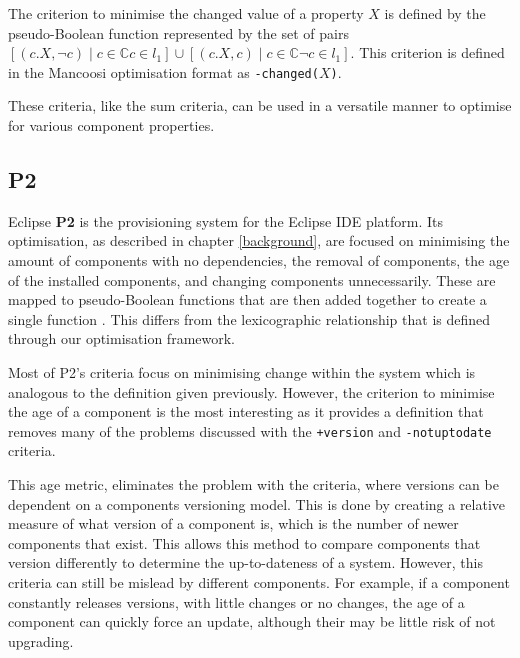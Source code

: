 \begin{defs}
The criterion to minimise the changed value of a property $X$ is defined by the pseudo-Boolean function 
represented by the set of pairs $[(c.X,\neg c) \mid c \in \mathbb{C} c \in l_1] \cup [(c.X,c) \mid c \in \mathbb{C} \neg c \in l_1]$.
This criterion is defined in the Mancoosi optimisation format as \verb!-changed(!$X$\verb+)+.
\end{defs}

These criteria, like the sum criteria, can be used in a versatile manner to optimise for various component properties.

\subsection{P2}
Eclipse \textbf{P2} \cite{le_berre_dependency_2009,leBerre2010} is the provisioning system for the Eclipse IDE platform.
Its optimisation, as described in chapter \ref{background}, are focused on minimising the amount of components with no dependencies, the removal of components,
the age of the installed components, and changing components unnecessarily.
These are mapped to pseudo-Boolean functions that are then added together to create a single function \citep{leBerre2010}.
This differs from the lexicographic relationship that is defined through our optimisation framework.

Most of P2's criteria focus on minimising change within the system which is analogous to the definition given previously.
However, the criterion to minimise the age of a component is the most interesting as it provides a definition that removes many of the problems
discussed with the  \verb!+version! and \verb+-notuptodate+ criteria.


This age metric, eliminates the problem with the criteria, where versions can be dependent on a components versioning model.
This is done by creating a relative measure of what version of a component is, which is the number of newer components that exist.
This allows this method to compare components that version differently to determine the up-to-dateness of a system.
However, this criteria can still be mislead by different components.
For example, if a component constantly releases versions, with little changes or no changes, the age of a component can quickly force an update, 
although their may be little risk of not upgrading. 


